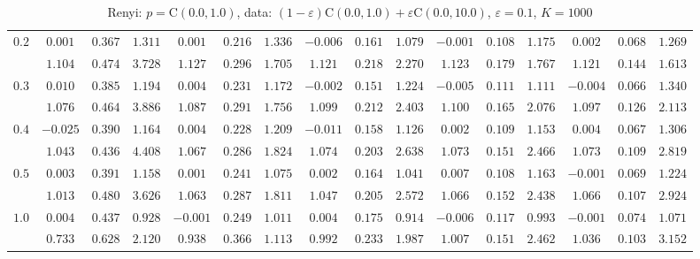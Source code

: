 \begin{table}[ht]
\begin{center}
\begin{tabular}{|c|ccc|ccc|ccc|ccc|ccc|}
\hline 
$0.2$ & $ 0.001 $ & $ 0.367 $ & $ 1.311 $ & $ 0.001 $ & $ 0.216 $ & $ 1.336 $ & $ -0.006 $ & $ 0.161 $ & $ 1.079 $ & $ -0.001 $ & $ 0.108 $ & $ 1.175 $ & $ 0.002 $ & $ 0.068 $ & $ 1.269 $\\ 
 & $ 1.104 $ & $ 0.474 $ & $ 3.728 $ & $ 1.127 $ & $ 0.296 $ & $ 1.705 $ & $ 1.121 $ & $ 0.218 $ & $ 2.270 $ & $ 1.123 $ & $ 0.179 $ & $ 1.767 $ & $ 1.121 $ & $ 0.144 $ & $ 1.613 $\\ 
\hline 
$0.3$ & $ 0.010 $ & $ 0.385 $ & $ 1.194 $ & $ 0.004 $ & $ 0.231 $ & $ 1.172 $ & $ -0.002 $ & $ 0.151 $ & $ 1.224 $ & $ -0.005 $ & $ 0.111 $ & $ 1.111 $ & $ -0.004 $ & $ 0.066 $ & $ 1.340 $\\ 
 & $ 1.076 $ & $ 0.464 $ & $ 3.886 $ & $ 1.087 $ & $ 0.291 $ & $ 1.756 $ & $ 1.099 $ & $ 0.212 $ & $ 2.403 $ & $ 1.100 $ & $ 0.165 $ & $ 2.076 $ & $ 1.097 $ & $ 0.126 $ & $ 2.113 $\\ 
\hline 
$0.4$ & $ -0.025 $ & $ 0.390 $ & $ 1.164 $ & $ 0.004 $ & $ 0.228 $ & $ 1.209 $ & $ -0.011 $ & $ 0.158 $ & $ 1.126 $ & $ 0.002 $ & $ 0.109 $ & $ 1.153 $ & $ 0.004 $ & $ 0.067 $ & $ 1.306 $\\ 
 & $ 1.043 $ & $ 0.436 $ & $ 4.408 $ & $ 1.067 $ & $ 0.286 $ & $ 1.824 $ & $ 1.074 $ & $ 0.203 $ & $ 2.638 $ & $ 1.073 $ & $ 0.151 $ & $ 2.466 $ & $ 1.073 $ & $ 0.109 $ & $ 2.819 $\\ 
\hline 
$0.5$ & $ 0.003 $ & $ 0.391 $ & $ 1.158 $ & $ 0.001 $ & $ 0.241 $ & $ 1.075 $ & $ 0.002 $ & $ 0.164 $ & $ 1.041 $ & $ 0.007 $ & $ 0.108 $ & $ 1.163 $ & $ -0.001 $ & $ 0.069 $ & $ 1.224 $\\ 
 & $ 1.013 $ & $ 0.480 $ & $ 3.626 $ & $ 1.063 $ & $ 0.287 $ & $ 1.811 $ & $ 1.047 $ & $ 0.205 $ & $ 2.572 $ & $ 1.066 $ & $ 0.152 $ & $ 2.438 $ & $ 1.066 $ & $ 0.107 $ & $ 2.924 $\\ 
\hline 
$1.0$ & $ 0.004 $ & $ 0.437 $ & $ 0.928 $ & $ -0.001 $ & $ 0.249 $ & $ 1.011 $ & $ 0.004 $ & $ 0.175 $ & $ 0.914 $ & $ -0.006 $ & $ 0.117 $ & $ 0.993 $ & $ -0.001 $ & $ 0.074 $ & $ 1.071 $\\ 
 & $ 0.733 $ & $ 0.628 $ & $ 2.120 $ & $ 0.938 $ & $ 0.366 $ & $ 1.113 $ & $ 0.992 $ & $ 0.233 $ & $ 1.987 $ & $ 1.007 $ & $ 0.151 $ & $ 2.462 $ & $ 1.036 $ & $ 0.103 $ & $ 3.152 $\\ 
\hline 
\end{tabular}
\caption{Renyi: $p = \mathrm{C}(0.0,1.0)$, data: $(1-\varepsilon)\mathrm{C}(0.0,1.0) + \varepsilon \mathrm{C}(0.0,10.0)$, $\varepsilon =  0.1$, $K = 1000$} 
\end{center}
\end{table}
